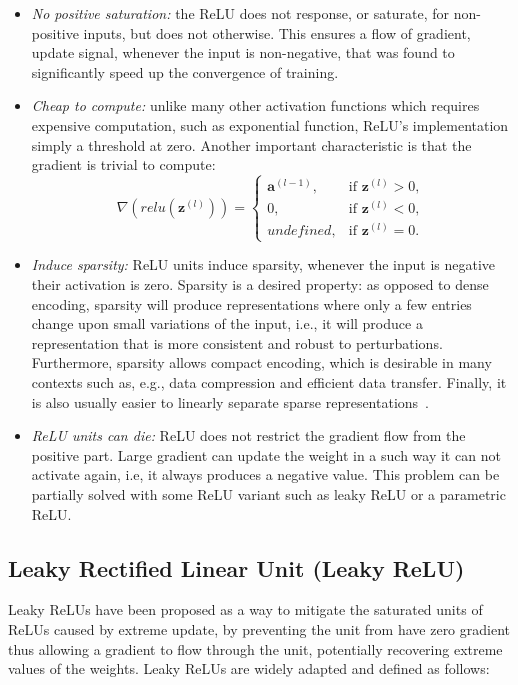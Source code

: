 \begin{itemize}
    \item \emph{No positive saturation:} the ReLU does not response, or saturate, for non-positive inputs, but does not otherwise. This ensures a flow of gradient, update signal, whenever the input is non-negative, that was found to significantly speed up the convergence of training.
    \item \emph{Cheap to compute:} unlike many other activation functions which requires expensive computation, such as exponential function, ReLU's implementation simply a threshold at zero. Another important characteristic is that the gradient is trivial to compute:
        \begin{equation}\label{eq:relu_derivative}
            \nabla (relu(\mathbf{z}^{(l)})) =
                \begin{cases}
                    \mathbf{a}^{(l-1)},  & \text{if } \mathbf{z}^{(l)} > 0 ,\\
                    0,          & \text{if } \mathbf{z}^{(l)} < 0 ,\\
                    undefined,  & \text{if } \mathbf{z}^{(l)} = 0.
                \end{cases}
        \end{equation}

    \item \emph{Induce sparsity:} ReLU units induce sparsity, whenever the input is negative their activation is zero. Sparsity is a desired property: as opposed to dense encoding, sparsity will produce representations where only a few entries change upon small variations of the input, i.e., it will produce a representation that is more consistent and robust to perturbations. Furthermore, sparsity allows compact encoding, which is desirable in many contexts such as, e.g., data compression and efficient data transfer.  Finally, it is also usually easier to linearly separate sparse representations~\cite{GlorotDeep2011}.
    \item \emph{ReLU units can die:} 
    ReLU does not restrict the gradient flow from the positive part. Large gradient can update the weight in a such way it can not activate again, i.e, it always produces a negative value. This problem can be partially solved with some ReLU variant such as leaky ReLU or a parametric ReLU.  
\end{itemize}

\subsection{Leaky Rectified Linear Unit (Leaky ReLU)}\label{sec:lrelu}
Leaky ReLUs have been proposed as a way to mitigate the saturated units of ReLUs caused by extreme update, by preventing the unit from have zero gradient thus allowing a  gradient to flow through the unit, potentially recovering extreme values of the weights. Leaky ReLUs are widely adapted and defined as follows:

